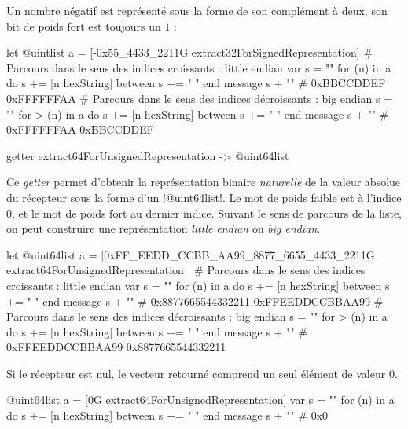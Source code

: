Un nombre négatif est représenté sous la forme de son complément à deux, son bit de poids fort est toujours un $1$ : 

\begin{galgas}
let @uintlist a = [-0x55_4433_2211G extract32ForSignedRepresentation]
# Parcours dans le sens des indices croissants : little endian
var s = ""
for (n) in a
  do s += [n hexString]
  between s += " "
end
message s + "\n" # 0xBBCCDDEF 0xFFFFFFAA
# Parcours dans le sens des indices décroissants : big endian
s = ""
for > (n) in a
  do s += [n hexString]
  between s += " "
end
message s + "\n" # 0xFFFFFFAA 0xBBCCDDEF
\end{galgas}






\begin{galgasbox}
getter extract64ForUnsignedRepresentation -> @uint64list
\end{galgasbox}

Ce \emph{getter} permet d'obtenir la représentation binaire \emph{naturelle} de la valeur absolue du récepteur sous la forme d'un \ggs!@uint64list!. Le mot de poids faible est à l'indice $0$, et le mot de poids fort au dernier indice. Suivant le sens de parcours de la liste, on peut construire une représentation \emph{little endian} ou \emph{big endian}.

\begin{galgas}
let @uint64list a = [0xFF_EEDD_CCBB_AA99_8877_6655_4433_2211G
  extract64ForUnsignedRepresentation
]
# Parcours dans le sens des indices croissants : little endian
var s = ""
for (n) in a
  do s += [n hexString]
  between s += " "
end
message s + "\n" # 0x8877665544332211 0xFFEEDDCCBBAA99
# Parcours dans le sens des indices décroissants : big endian
s = ""
for > (n) in a
  do s += [n hexString]
  between s += " "
end
message s + "\n" # 0xFFEEDDCCBBAA99 0x8877665544332211
\end{galgas}

Si le récepteur est nul, le vecteur retourné comprend un seul élément de valeur $0$.

\begin{galgas}
@uint64list a = [0G extract64ForUnsignedRepresentation]
var s = ""
for (n) in a
  do s += [n hexString]
  between s += " "
end
message s + "\n" # 0x0
\end{galgas}




